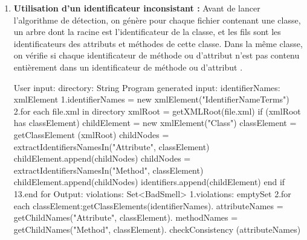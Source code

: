 \begin{enumerate}
\newline
\item \textbf {	Utilisation d’un identificateur inconsistant :}
Avant de lancer l'algorithme de détection, on génère pour chaque fichier contenant une classe, un arbre dont la racine est l'identificateur de la classe, et les fils sont les identificateurs des attributs et méthodes de cette classe.
Dans la même classe, on vérifie si chaque identificateur de méthode ou d'attribut n'est pas contenu entièrement dans un identificateur de méthode ou d'attribut \cite{abebe2009lexicon}.
\begin{framed}
  {\selectfont  
User input:\newline
directory: String\newline
Program generated input:\newline
identifierNames: xmlElement\newline
1.identifierNames = new xmlElement("IdentifierNameTerms")\newline
2.for each file.xml in directory\newline
	xmlRoot = getXMLRoot(file.xml)\newline
	if (xmlRoot has classElement)\newline
		childElement = new xmlElement("Class")\newline
		classElement = getClassElement (xmlRoot)\newline
		childNodes = extractIdentifiersNamesIn("Attribute", classElement)\newline
		childElement.append(childNodes)\newline
		childNodes = extractIdentifiersNamesIn("Method", classElement)\newline
		childElement.append(childNodes)\newline
		identifiers.append(childElement)\newline
	end if\newline
13.end for\newline
Output:\newline
violations: Set<BadSmell>\newline
1.violations: emptySet\newline
2.for each classElement:getClassElements(identifierNames).   attributeNames = getChildNames("Attribute", classElement).   methodNames = getChildNames("Method", classElement).   checkConsistency (attributeNames)\newline
}
\end{framed}
\end{enumerate}

